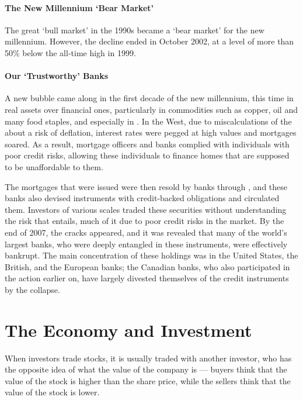 \documentclass[notoc,notitlepage]{tufte-book}
\begin{document}
\paragraph{The New Millennium `Bear Market'} 
The great `bull market'  in the 1990s
became a `bear market' 
for the new millennium.
However, the decline ended in October 2002,
at a level of more than 50\% below the all-time high in 1999.

\paragraph{Our `Trustworthy' Banks}
A new bubble came along in the first decade of the new millennium,
this time in real assets over financial ones, particularly in commodities
such as copper, oil and many food staples, and especially in .
In the West, due to miscalculations of the  about
a risk of deflation, interest rates were pegged at high values
and mortgages soared.
As a result, mortgage officers and banks complied with
individuals with poor credit risks, allowing these individuals to finance
homes that are supposed to be unaffordable to them.

The mortgages that were issued were then resold by banks through
,
and these banks also devised instruments with credit-backed obligations
and circulated them.
Investors of various scales traded these securities without understanding
the risk that entails, much of it due to poor credit risks in the market.
By the end of 2007, the cracks appeared, and it was revealed
that many of the world's largest banks,
who were deeply entangled in these instruments,
were effectively bankrupt.
The main concentration of these holdings was in the United States,
the British, and the European banks; the Canadian banks,
who also participated in the action earlier on,
have largely divested themselves of the credit instruments by the collapse.


\section{The Economy and Investment}%
\label{sec:the_economy_and_investment}

When investors trade stocks, it is usually traded with another investor,
who has the opposite idea of what the value of the company is ---
buyers think that the value of the stock is higher than the share price,
while the sellers think that the value of the stock is lower.
\end{document}
